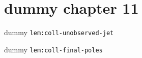 \clearpage\begingroup\small
\setcounter{chapter}{11}\addtocounter{chapter}{-1}
\chapter{dummy chapter 11}
\begin{lemma}\label{lem:coll-unobserved-jet}dummy \texttt{lem:coll-unobserved-jet}\end{lemma}
\begin{lemma}\label{lem:coll-final-poles}dummy \texttt{lem:coll-final-poles}\end{lemma}
\endgroup

